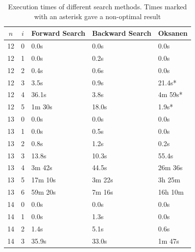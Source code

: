 \documentclass[10pt,journal,compsoc]{IEEEtran}
\begin{document}
\begin{table}[!t]
  \renewcommand{\arraystretch}{1.2}
  \caption{Execution times of different search methods. Times marked with an asterisk gave a non-optimal result}
  \label{table:search_algorithms}
  \centering
  \begin{tabular}{c|c|l|l|l}
    $n$ & $i$ & \textbf{Forward Search} & \textbf{Backward Search} & \textbf{Oksanen} \\
    \hline
    12  & 0   & 0.0s                    & 0.0s                     & 0.0s             \\
    12  & 1   & 0.0s                    & 0.2s                     & 0.0s             \\
    12  & 2   & 0.4s                    & 0.6s                     & 0.0s             \\
    12  & 3   & 3.5s                    & 0.9s                     & 21.4s*           \\
    12  & 4   & 36.1s                   & 3.8s                     & 4m 59s*          \\
    12  & 5   & 1m 30s                  & 18.0s                    & 1.9s*            \\
    \hline
    13  & 0   & 0.0s                    & 0.0s                     & 0.0s             \\
    13  & 1   & 0.0s                    & 0.5s                     & 0.0s             \\
    13  & 2   & 0.8s                    & 1.2s                     & 0.2s             \\
    13  & 3   & 13.8s                   & 10.3s                    & 55.4s            \\
    13  & 4   & 3m 42s                  & 44.5s                    & 26m 36s          \\
    13  & 5   & 17m 10s                 & 3m 22s                   & 3h 25m           \\
    13  & 6   & 59m 20s                 & 7m 16s                   & 16h 10m          \\
    \hline
    14  & 0   & 0.0s                    & 0.0s                     & 0.0s             \\
    14  & 1   & 0.0s                    & 1.3s                     & 0.0s             \\
    14  & 2   & 1.4s                    & 5.1s                     & 0.6s             \\
    14  & 3   & 35.9s                   & 33.0s                    & 1m 47s           \\

\end{tabular}
\end{table}
\end{document}
